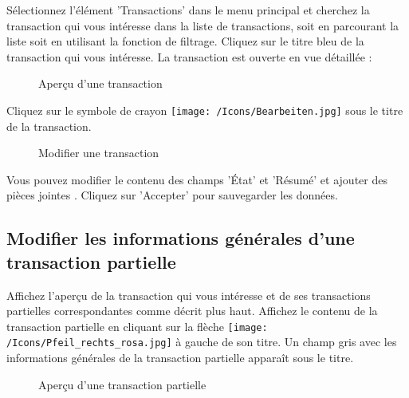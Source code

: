 Sélectionnez l'élément 'Transactions' dans le menu principal et cherchez la transaction qui vous intéresse dans la liste de transactions, soit en parcourant la liste soit en utilisant la fonction de filtrage. Cliquez sur le titre bleu de la transaction qui vous intéresse. La transaction est ouverte en vue détaillée :

\begin{figure}[H]
\caption{Aperçu d'une transaction}
\end{figure}

Cliquez sur le symbole de crayon \texttt{[image: /Icons/Bearbeiten.jpg]}  sous le titre de la transaction.

\begin{figure}[H]
\caption{Modifier une transaction}
\end{figure}

Vous pouvez modifier le contenu des champs 'État'  et 'Résumé'  et ajouter des pièces jointes . Cliquez sur 'Accepter'  pour sauvegarder les données.

\subsection{Modifier les informations générales d'une transaction partielle}

Affichez l'aperçu de la transaction qui vous intéresse et de ses transactions partielles correspondantes comme décrit plus haut. Affichez le contenu de la transaction partielle en cliquant sur la flèche \texttt{[image: /Icons/Pfeil\_rechts\_rosa.jpg]} à gauche de son titre. Un champ gris  avec les informations générales de la transaction partielle apparaît sous le titre.

\begin{figure}[H]
\caption{Aperçu d'une transaction partielle}
\end{figure}

